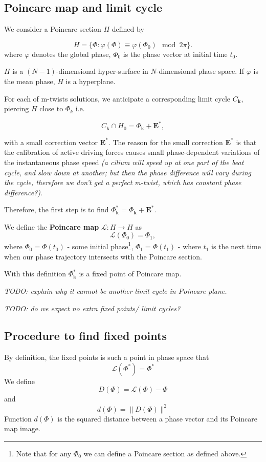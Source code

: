 \documentclass[a4paper,10pt]{article}
\renewcommand*{\vec}[1]{\mathbf{#1}}
\begin{document}
\subsection{Poincare map and limit cycle}
We consider a Poincare section $H$ defined by

$$
H =\{ \Phi : \varphi(\Phi) \equiv \varphi(\Phi_0) \mod 2\pi \}.
$$
where $\varphi$ denotes the global phase, $\Phi_0$ is the phase vector at initial time $t_0$. 

 $H$ is a $(N-1)$-dimensional hyper-surface in $N$-dimensional phase space. If $\varphi$ is the mean phase, $H$ is a hyperplane.

For each of m-twists solutions, we anticipate a corresponding limit cycle $C_\vec{k}$, piercing $H$ close to $\Phi_k$ i.e.

$$
C_\vec{k} \cap H_0 = \Phi_\vec{k} + \mathbf{E}^*,
$$

with a small correction vector $\mathbf{E}^*$.
The reason for the small correction $\mathbf{E}^*$ is that the calibration of active driving forces causes small phase-dependent variations of the instantaneous phase speed \textit{(a cilium will speed up at one part of the beat cycle, and slow down at another; but then the phase difference will vary during the cycle, therefore we don't get a perfect m-twist, which has constant phase difference?)}.

Therefore, the first step is to find $\Phi^*_\vec{k}=\Phi_\vec{k} + \mathbf{E}^*$.

We define the \textbf{Poincare map} $\mathcal{L}: H \rightarrow H$ as
 $$\mathcal{L}(\Phi_0) = \Phi_1,$$
where
$\Phi_0 = \Phi(t_0)$ - some initial phase\footnote{Note that for any $\Phi_0$ we can define a Poincare section as defined above.},
$\Phi_1=\Phi(t_1)$ - where $t_1$ is the next time when our phase trajectory intersects with the Poincare section.

With this definition  $\Phi^*_\vec{k}$ is a fixed point of Poincare map.

\textit{TODO: explain why it cannot be another limit cycle in Poincare plane. }

\textit{TODO: do we expect no extra fixed points/ limit cycles?}

\subsection{Procedure to find fixed points}
\label{sec:fixpoint}

By definition, the fixed points is such a point in phase space that
$$
\mathcal{L}(\Phi^*) = \Phi^*
$$
We define
$$
D(\Phi) = \mathcal{L}(\Phi) - \Phi
$$
and
$$
d(\Phi) = \lVert D(\Phi) \rVert ^ 2
$$
Function $d(\Phi)$ is the squared distance between a phase vector and its Poincare map image.
\end{document}
